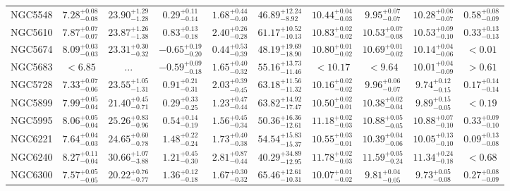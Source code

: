 \documentclass[onecolumn]{mn2e}
\begin{document}
\begin{landscape}
{\begin{center}
\begin{longtable}{lccccccccc}
NGC5548 & $7.28_{-0.08}^{+0.08}$ & $23.90_{-1.28}^{+1.29}$ & $0.29_{-0.14}^{+0.11}$ & $1.68_{-0.40}^{+0.44}$ &$46.89_{-8.92}^{+12.24}$ & $10.44_{-0.03}^{+0.04}$ & $9.95_{-0.07}^{+0.07}$ & $10.28_{-0.07}^{+0.06}$ & $0.58_{-0.09}^{+0.08}$ \\
NGC5610 & $7.87_{-0.07}^{+0.07}$ & $23.87_{-1.38}^{+1.26}$ & $0.83_{-0.18}^{+0.13}$ & $2.40_{-0.28}^{+0.26}$ &$61.17_{-10.13}^{+10.52}$ & $10.83_{-0.02}^{+0.02}$ & $10.53_{-0.08}^{+0.07}$ & $10.53_{-0.10}^{+0.09}$ & $0.33_{-0.13}^{+0.13}$ \\
NGC5674 & $8.09_{-0.03}^{+0.03}$ & $23.31_{-0.32}^{+0.30}$ & $-0.65_{-0.20}^{+0.19}$ & $0.44_{-0.39}^{+0.53}$ &$48.19_{-18.90}^{+19.69}$ & $10.80_{-0.02}^{+0.01}$ & $10.69_{-0.02}^{+0.01}$ & $10.14_{-0.06}^{+0.04}$ & $<0.01$ \\
NGC5683 & $<6.85$ & ... & $-0.59_{-0.18}^{+0.09}$ & $1.65_{-0.32}^{+0.40}$ &$55.16_{-11.46}^{+13.73}$ & $<10.17$ & $<9.64$ & $10.01_{-0.09}^{+0.04}$ & $>0.61$ \\
NGC5728 & $7.33_{-0.06}^{+0.07}$ & $23.55_{-1.31}^{+1.05}$ & $0.91_{-0.31}^{+0.21}$ & $2.03_{-0.45}^{+0.39}$ &$63.18_{-11.32}^{+11.56}$ & $10.16_{-0.02}^{+0.02}$ & $9.96_{-0.07}^{+0.06}$ & $9.74_{-0.15}^{+0.12}$ & $0.17_{-0.14}^{+0.14}$ \\
NGC5899 & $7.99_{-0.04}^{+0.05}$ & $21.40_{-0.71}^{+0.45}$ & $0.29_{-0.25}^{+0.33}$ & $1.23_{-0.44}^{+0.47}$ &$63.82_{-17.47}^{+14.92}$ & $10.50_{-0.01}^{+0.02}$ & $10.38_{-0.04}^{+0.02}$ & $9.89_{-0.05}^{+0.15}$ & $<0.19$ \\
NGC5995 & $8.06_{-0.04}^{+0.05}$ & $25.26_{-0.96}^{+0.83}$ & $0.54_{-0.19}^{+0.14}$ & $1.56_{-0.34}^{+0.45}$ &$50.36_{-12.61}^{+16.36}$ & $11.18_{-0.03}^{+0.02}$ & $10.88_{-0.05}^{+0.05}$ & $10.88_{-0.10}^{+0.07}$ & $0.33_{-0.10}^{+0.09}$ \\
NGC6221 & $7.64_{-0.03}^{+0.04}$ & $24.65_{-0.78}^{+0.60}$ & $1.48_{-0.24}^{+0.22}$ & $1.73_{-0.38}^{+0.40}$ &$54.54_{-15.37}^{+15.83}$ & $10.55_{-0.01}^{+0.03}$ & $10.39_{-0.06}^{+0.04}$ & $10.05_{-0.10}^{+0.13}$ & $0.09_{-0.08}^{+0.13}$ \\
NGC6240 & $8.27_{-0.04}^{+0.11}$ & $30.66_{-3.88}^{+1.07}$ & $1.21_{-0.30}^{+0.45}$ & $2.81_{-0.44}^{+0.87}$ &$40.29_{-12.95}^{+34.89}$ & $11.78_{-0.03}^{+0.02}$ & $11.59_{-0.24}^{+0.05}$ & $11.34_{-0.18}^{+0.24}$ & $<0.68$ \\
NGC6300 & $7.57_{-0.05}^{+0.05}$ & $20.22_{-0.77}^{+0.76}$ & $1.36_{-0.18}^{+0.12}$ & $1.67_{-0.32}^{+0.30}$ &$65.46_{-10.31}^{+12.61}$ & $10.07_{-0.02}^{+0.01}$ & $9.81_{-0.05}^{+0.04}$ & $9.73_{-0.08}^{+0.05}$ & $0.27_{-0.09}^{+0.08}$ \\

\end{longtable}
\end{center}}
\end{landscape}
\end{document}
